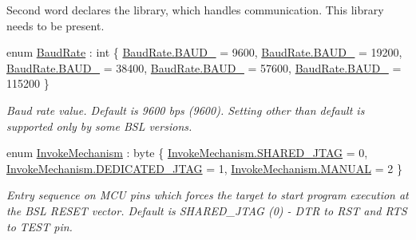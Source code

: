 \begin{DoxyCompactItemize}
\begin{DoxyCompactList}
Second word declares the library, which handles communication. This library needs to be present. \end{DoxyCompactList}\item 
enum \mbox{\hyperlink{namespace_b_s_l430___n_e_t_a8d30c263598635a481840944d38aeb70}{Baud\+Rate}} \+: int \{ \newline
\mbox{\hyperlink{namespace_b_s_l430___n_e_t_a8d30c263598635a481840944d38aeb70a35de50c520011baf226b81865ed5ae94}{Baud\+Rate.\+B\+A\+U\+D\+\_}} = 9600, 
\mbox{\hyperlink{namespace_b_s_l430___n_e_t_a8d30c263598635a481840944d38aeb70ae0f726d9f87f8874aa8f8a5e3bdffda1}{Baud\+Rate.\+B\+A\+U\+D\+\_}} = 19200, 
\mbox{\hyperlink{namespace_b_s_l430___n_e_t_a8d30c263598635a481840944d38aeb70a6aa297ec67f069d6c1dc929bcd2e561e}{Baud\+Rate.\+B\+A\+U\+D\+\_}} = 38400, 
\mbox{\hyperlink{namespace_b_s_l430___n_e_t_a8d30c263598635a481840944d38aeb70ab09272971cc3e7e6aa1e84869c2d6942}{Baud\+Rate.\+B\+A\+U\+D\+\_}} = 57600, 
\newline
\mbox{\hyperlink{namespace_b_s_l430___n_e_t_a8d30c263598635a481840944d38aeb70adf0ddcf34c8454b3f328134629f9d9ae}{Baud\+Rate.\+B\+A\+U\+D\+\_}} = 115200
 \}
\begin{DoxyCompactList}\small\item\em Baud rate value. Default is 9600 bps (9600). Setting other than default is supported only by some B\+SL versions. \end{DoxyCompactList}\item 
enum \mbox{\hyperlink{namespace_b_s_l430___n_e_t_a6571fdf0fbbc8408b8428f4d642c1305}{Invoke\+Mechanism}} \+: byte \{ \mbox{\hyperlink{namespace_b_s_l430___n_e_t_a6571fdf0fbbc8408b8428f4d642c1305a5ef5378a5d2c07ce5f51f312850afec0}{Invoke\+Mechanism.\+S\+H\+A\+R\+E\+D\+\_\+\+J\+T\+AG}} = 0, 
\mbox{\hyperlink{namespace_b_s_l430___n_e_t_a6571fdf0fbbc8408b8428f4d642c1305aa643869331e1585816b884997641dfd6}{Invoke\+Mechanism.\+D\+E\+D\+I\+C\+A\+T\+E\+D\+\_\+\+J\+T\+AG}} = 1, 
\mbox{\hyperlink{namespace_b_s_l430___n_e_t_a6571fdf0fbbc8408b8428f4d642c1305aa60a6a471c0681e5a49c4f5d00f6bc5a}{Invoke\+Mechanism.\+M\+A\+N\+U\+AL}} = 2
 \}
\begin{DoxyCompactList}\small\item\em Entry sequence on M\+CU pins which forces the target to start program execution at the B\+SL R\+E\+S\+ET vector. Default is S\+H\+A\+R\+E\+D\+\_\+\+J\+T\+AG (0) -\/ D\+TR to R\+ST and R\+TS to T\+E\+ST pin. \end{DoxyCompactList}\item 

\end{DoxyCompactItemize}
